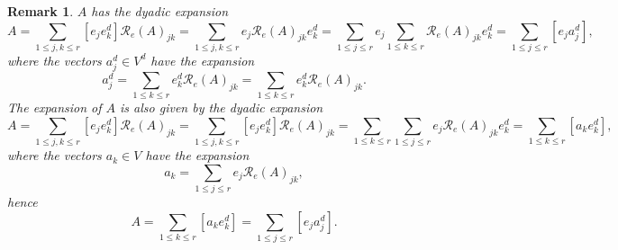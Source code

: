 \documentclass[aps,preprint]{revtex4}%
\newtheorem{remark}[theorem]{Remark}
\begin{document}
\begin{remark}
$A$ has the dyadic expansion
\begin{equation}
A=\sum_{1\leq j,k\leq r}\left[  e_{j}e_{k}^{d}\right]  \mathcal{R}_{e}\left(
A\right)  _{jk}=\sum_{1\leq j,k\leq r}e_{j}\mathcal{R}_{e}\left(  A\right)
_{jk}e_{k}^{d}=\sum_{1\leq j\leq r}e_{j}\sum_{1\leq k\leq r}\mathcal{R}%
_{e}\left(  A\right)  _{jk}e_{k}^{d}=\sum_{1\leq j\leq r}\left[  e_{j}%
a_{j}^{d}\right]  ,
\end{equation}
where the vectors $a_{j}^{d}\in V^{d}$ have the expansion
\begin{equation}
a_{j}^{d}=\sum_{1\leq k\leq r}e_{k}^{d}\mathcal{R}_{e}\left(  A\right)
_{jk}=\sum_{1\leq k\leq r}e_{k}^{d}\mathcal{R}_{e}\left(  A\right)  _{jk}.
\end{equation}
The expansion of $A$ is also given by the dyadic expansion
\begin{equation}
A=\sum_{1\leq j,k\leq r}\left[  e_{j}e_{k}^{d}\right]  \mathcal{R}_{e}\left(
A\right)  _{jk}=\sum_{1\leq j,k\leq r}\left[  e_{j}e_{k}^{d}\right]
\mathcal{R}_{e}\left(  A\right)  _{jk}=\sum_{1\leq k\leq r}\sum_{1\leq j\leq
r}e_{j}\mathcal{R}_{e}\left(  A\right)  _{jk}e_{k}^{d}=\sum_{1\leq k\leq
r}\left[  a_{k}e_{k}^{d}\right]  ,
\end{equation}
where the vectors $a_{k}\in V$ have the expansion%
\begin{equation}
a_{k}=\sum_{1\leq j\leq r}e_{j}\mathcal{R}_{e}\left(  A\right)  _{jk},
\end{equation}
hence
\begin{equation}
A=\sum_{1\leq k\leq r}\left[  a_{k}e_{k}^{d}\right]  =\sum_{1\leq j\leq
r}\left[  e_{j}a_{j}^{d}\right]  .
\end{equation}

\end{remark}
\end{document}
